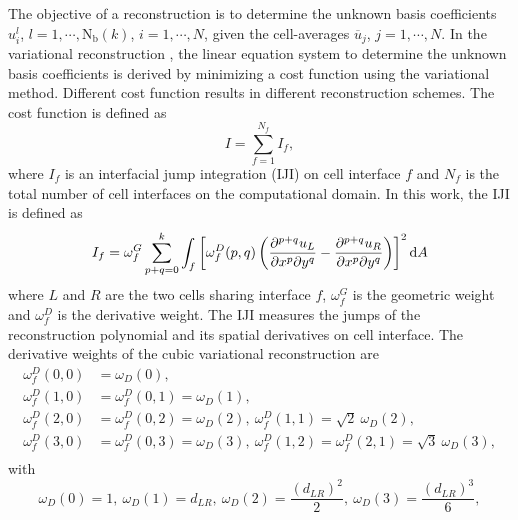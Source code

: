 The objective of a reconstruction is to determine the unknown basis coefficients $u_i^l$,  $l=1,\cdots,\mathrm{N_b}\left(k\right)$, $i=1,\cdots,N$, given the cell-averages $\overline{u}_j$, $j=1,\cdots,N$. In the variational reconstruction \cite{wang2017compact_VR}, the linear equation system to determine the unknown basis coefficients is derived by minimizing a cost function using the variational method. Different cost function results in different reconstruction schemes. The cost function is defined as
\begin{equation}
	\label{eq:cost-function}
    I = \sum^{N_f}_{f=1} {I_f},
\end{equation}
where $I_f$ is an interfacial jump integration (IJI) on cell interface $f$ and $N_f$ is the total number of cell interfaces on the computational domain.
In this work, the IJI is defined as
\begin{equation}
	\label{eq:IJI}
    I_f = \omega_f^G \sum_{p+q=0}^{k} \int_{f}{
        \left[
            \omega_f^D(p,q)
            \left(
            \partialderivative{^{p+q}u_L}{x^p\partial y^q}
            -
            \partialderivative{^{p+q}u_R}{x^p\partial y^q}
            \right)
            \right]^2
        \dd A
    }
\end{equation}
where $L$ and $R$ are the two cells sharing interface $f$, $\omega_f^G$ is the geometric weight and
$\omega_f^D$ is the derivative weight. The IJI measures the jumps of the reconstruction polynomial and its spatial derivatives on cell interface. 
The derivative weights of the cubic variational reconstruction are
\begin{equation}
    \begin{aligned}
        \omega_f^D(0,0) & = \omega_D(0),                                                                                   \\
        \omega_f^D(1,0) & = \omega_f^D(0,1) = \omega_D(1) ,                                                                 \\
        \omega_f^D(2,0) & = \omega_f^D(0,2) = \omega_D(2),\ \omega_f^D(1,1) = \sqrt{2}\ \omega_D(2)  ,                 \\
        \omega_f^D(3,0) & = \omega_f^D(0,3) = \omega_D(3),\ \omega_f^D(1,2) = \omega_f^D(2,1) = \sqrt{3}\ \omega_D(3), \\
    \end{aligned}
    \label{eq:wdRotRatio}
\end{equation}
with
\begin{equation}
    \omega_D(0) = 1, \ \omega_D(1) = d_{LR}, \ \omega_D(2) = \frac{\left(d_{LR}\right)^2}{2}, \ \omega_D(3) = \frac{\left(d_{LR}\right)^3}{6},
    \label{eq:wdHQMOPT}
\end{equation}
